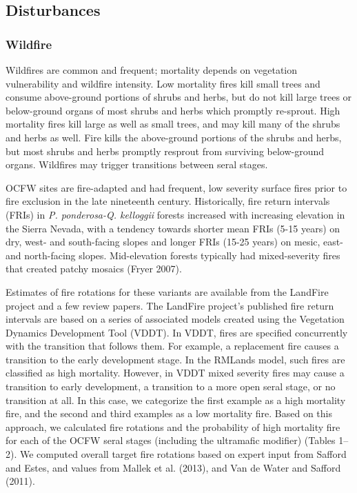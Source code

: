 \subsection*{Disturbances}

\subsubsection{Wildfire}
Wildfires are common and frequent; mortality depends on vegetation vulnerability and wildfire intensity. Low mortality fires kill small trees and consume above-ground portions of shrubs and herbs, but do not kill large trees or below-ground organs of most shrubs and herbs which promptly re-sprout. High mortality fires kill large as well as small trees, and may kill many of the shrubs and herbs as well. Fire kills the above-ground portions of the shrubs and herbs, but most shrubs and herbs promptly resprout from surviving below-ground organs. Wildfires may trigger transitions between seral stages.

OCFW sites are fire-adapted and had frequent, low severity surface fires prior to fire exclusion in the late nineteenth century. Historically, fire return intervals (FRIs) in \emph{P. ponderosa-Q. kelloggii} forests increased with increasing elevation in the Sierra Nevada, with a tendency towards shorter mean FRIs (5-15 years) on dry, west- and south-facing slopes and longer FRIs (15-25 years) on mesic, east- and north-facing slopes. Mid-elevation forests typically had mixed-severity fires that created patchy mosaics (Fryer 2007).

Estimates of fire rotations for these variants are available from the LandFire project and a few review papers. The LandFire project’s published fire return intervals are based on a series of associated models created using the Vegetation Dynamics Development Tool (VDDT). In VDDT, fires are specified concurrently with the transition that follows them. For example, a replacement fire causes a transition to the early development stage. In the RMLands model, such fires are classified as high mortality. However, in VDDT mixed severity fires may cause a transition to early development, a transition to a more open seral stage, or no transition at all. In this case, we categorize the first example as a high mortality fire, and the second and third examples as a low mortality fire. Based on this approach, we calculated fire rotations and the probability of high mortality fire for each of the OCFW seral stages (including the ultramafic modifier) (Tables 1–2). We computed overall target fire rotations based on expert input from Safford and Estes, and values from Mallek et al. (2013), and Van de Water and Safford (2011). 




